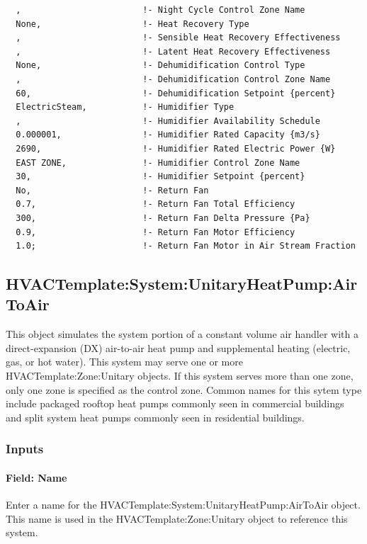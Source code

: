 \begin{lstlisting}
  ,                        !- Night Cycle Control Zone Name
  None,                    !- Heat Recovery Type
  ,                        !- Sensible Heat Recovery Effectiveness
  ,                        !- Latent Heat Recovery Effectiveness
  None,                    !- Dehumidification Control Type
  ,                        !- Dehumidification Control Zone Name
  60,                      !- Dehumidification Setpoint {percent}
  ElectricSteam,           !- Humidifier Type
  ,                        !- Humidifier Availability Schedule
  0.000001,                !- Humidifier Rated Capacity {m3/s}
  2690,                    !- Humidifier Rated Electric Power {W}
  EAST ZONE,               !- Humidifier Control Zone Name
  30,                      !- Humidifier Setpoint {percent}
  No,                      !- Return Fan
  0.7,                     !- Return Fan Total Efficiency
  300,                     !- Return Fan Delta Pressure {Pa}
  0.9,                     !- Return Fan Motor Efficiency
  1.0;                     !- Return Fan Motor in Air Stream Fraction
\end{lstlisting}

\subsection{HVACTemplate:System:UnitaryHeatPump:AirToAir}\label{hvactemplatesystemunitaryheatpumpairtoair}

This object simulates the system portion of a constant volume air handler with a direct-expansion (DX) air-to-air heat pump and supplemental heating (electric, gas, or hot water). This system may serve one or more HVACTemplate:Zone:Unitary objects. If this system serves more than one zone, only one zone is specified as the control zone. Common names for this sytem type include packaged rooftop heat pumps commonly seen in commercial buildings and split system heat pumps commonly seen in residential buildings.

\subsubsection{Inputs}\label{inputs-16-004}

\paragraph{Field: Name}\label{field-name-3-016}

Enter a name for the HVACTemplate:System:UnitaryHeatPump:AirToAir object. This name is used in the HVACTemplate:Zone:Unitary object to reference this system.

